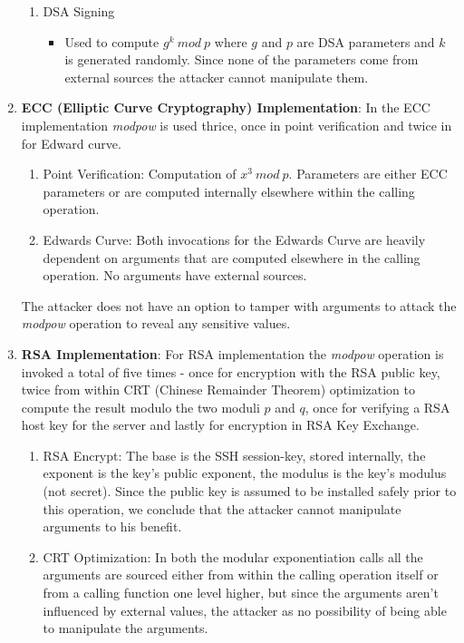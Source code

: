 \documentclass{bhamthesis}
\begin{document}
\begin{enumerate}
\begin{enumerate}
        \item{DSA Signing}
        \begin{itemize}
        \item
        Used to compute \(g^k \ mod \ p\) where \(g\) and \(p\) are DSA parameters and \(k\) is generated randomly. Since none of the parameters come from external sources the attacker cannot manipulate them.
        \end{itemize}
        \end{enumerate}
    \item \textbf{ECC (Elliptic Curve Cryptography) Implementation}:
        In the ECC implementation \textit{modpow} is used thrice, once in point verification and twice in for Edward curve.
        \begin{enumerate}
            \item {Point Verification}:
            Computation of \(x^3\ mod\ p\). Parameters are either ECC parameters or are computed internally elsewhere within the calling operation.
            \item{Edwards Curve}:
            Both invocations for the Edwards Curve are heavily dependent on arguments that are computed elsewhere in the calling operation. No arguments have external sources.
        \end{enumerate}
        The attacker does not have an option to tamper with arguments to attack the \textit{modpow} operation to reveal any sensitive values.
    \item \textbf{RSA Implementation}: For RSA implementation the \textit{modpow} operation is invoked a total of five times - once for encryption with the RSA public key, twice from within CRT (Chinese Remainder Theorem) optimization to compute the result modulo the two moduli \(p\) and \(q\), once for verifying a RSA host key for the server and lastly for encryption in RSA Key Exchange.
        \begin{enumerate}
            \item{RSA Encrypt}: The base is the SSH session-key, stored internally, the exponent is the key's public exponent, the modulus is the key's modulus (not secret). Since the public key is assumed to be installed safely prior to this operation, we conclude that the attacker cannot manipulate arguments to his benefit.
            \item{CRT Optimization}: In both the modular exponentiation calls all the arguments are sourced either from within the calling operation itself or from a calling function one level higher, but since the arguments aren't influenced by external values, the attacker as no possibility of being able to manipulate the arguments.

\end{enumerate}
\end{enumerate}
\end{document}

